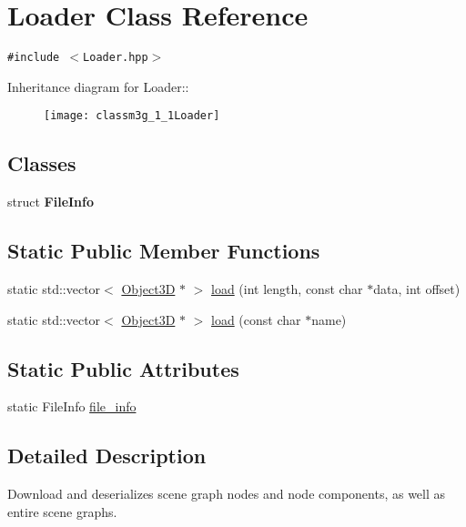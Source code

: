 \hypertarget{classm3g_1_1Loader}{
\section{Loader Class Reference}
\label{classm3g_1_1Loader}
}
{\tt \#include $<$Loader.hpp$>$}

Inheritance diagram for Loader::\begin{figure}[H]
\begin{center}
\leavevmode
\texttt{[image: classm3g\_1\_1Loader]}
\end{center}
\end{figure}
\subsection*{Classes}
\begin{CompactItemize}
\item 
struct \textbf{FileInfo}
\end{CompactItemize}
\subsection*{Static Public Member Functions}
\begin{CompactItemize}
\item 
static std::vector$<$ \hyperlink{classm3g_1_1Object3D}{Object3D} $\ast$ $>$ \hyperlink{classm3g_1_1Loader_226696271b917ad797016959bb7adbe1}{load} (int length, const char $\ast$data, int offset)
\item 
static std::vector$<$ \hyperlink{classm3g_1_1Object3D}{Object3D} $\ast$ $>$ \hyperlink{classm3g_1_1Loader_27bd86888cdadd349223dcb303e45879}{load} (const char $\ast$name)
\end{CompactItemize}
\subsection*{Static Public Attributes}
\begin{CompactItemize}
\item 
static FileInfo \hyperlink{classm3g_1_1Loader_b5b2e875f7353dca9dad61c686bccf92}{file\_\-info}
\end{CompactItemize}


\subsection{Detailed Description}
Download and deserializes scene graph nodes and node components, as well as entire scene graphs. 


